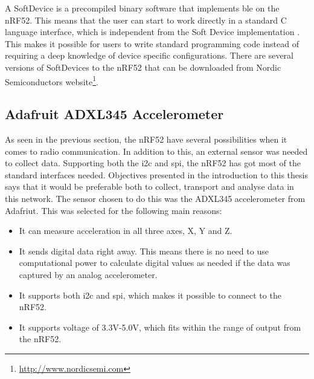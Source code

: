 



\noindent A SoftDevice is a precompiled binary software that implements \gls{ble} on the nRF52. This means that the user can start to work directly in a standard C language interface, which is independent from the Soft Device implementation \cite{softDevice}. This makes it possible for users to write standard programming code instead of requiring a deep knowledge of device specific configurations. There are several versions of SoftDevices to the nRF52 that can be downloaded from Nordic Semiconductors website\footnote{\url{http://www.nordicsemi.com}}. 


\subsection{Adafruit ADXL345 Accelerometer}

\noindent As seen in the previous section, the nRF52 have several possibilities when it comes to radio communication. In addition to this, an external sensor was needed to collect data. Supporting both the \gls{i2c} and \gls{spi}, the nRF52 has got most of the standard interfaces needed. Objectives presented in the introduction to this thesis says that it would be preferable both to collect, transport and analyse data in this network. The sensor chosen to do this was the ADXL345 accelerometer from Adafriut. This was selected for the following main reasons:  

\begin{itemize}
  \item It can measure acceleration in all three axes, X, Y and Z.
  \item It sends digital data right away. This means there is no need to use computational power to calculate digital values as needed if the data was captured by an analog accelerometer. 
  \item It supports both \gls{i2c} and \gls{spi}, which makes it possible to connect to the nRF52. 
  \item It supports voltage of 3.3V-5.0V, which fits within the range of output from the nRF52.  
\end{itemize}


